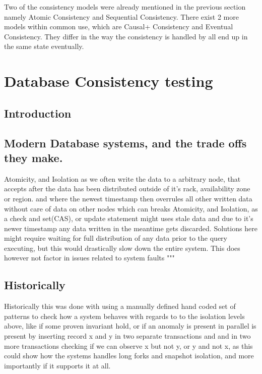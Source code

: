 \documentclass[a4paper,10pt,titlepage]{report}
\begin{document}
    Two of the consistency models were already mentioned in the previous section namely Atomic Consistency and Sequential Consistency. There exist 2 more models within common use, which are Causal+ Consistency and Eventual Consistency. They differ in the way the consistency is handled by all end up in the same state eventually.





    \newpage


    \chapter{Database Consistency testing}


    \section{Introduction}


    \section{Modern Database systems, and the trade offs they make.}

    Atomicity, and Isolation as we often write the data to a arbitrary node, that accepts after the data has been distributed outside of it's rack, availability zone or region. and where the newest timestamp then overrules all other written data without care of data on other nodes which can breaks Atomicity, and Isolation, as a check and set(CAS), or update statement might uses stale data and due to it's newer timestamp any data written in the meantime gets discarded. Solutions here might require waiting for full distribution of any data prior to the query executing, but this would drastically slow down the entire system. This does however not factor in issues related to system faults
    """


    \section{Historically}

    Historically this was done with using a manually defined hand coded set of patterns to check how a system behaves with regards to to the isolation levels above, like if some proven invariant hold, or if an anomaly is present in parallel is present by inserting record x and y in two separate transactions and and in two more transactions checking if we can observe x but not y, or y and not x, as this could show how the systems handles long forks and snapshot isolation, and more importantly if it supports it at all.
\end{document}
